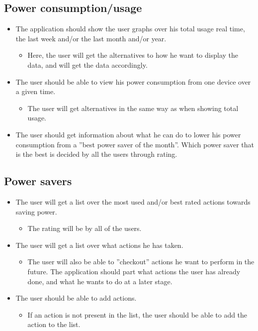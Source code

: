 \subsection{Power consumption/usage}
\begin{itemize}
\item The application should show the user graphs over his total usage real time, the last week and/or the last month and/or year.
\begin{itemize}
\item Here, the user will get the alternatives to how he want to display the data, and will get the data accordingly.
\end{itemize}
\item The user should be able to view his power consumption from one device over a given time.
\begin{itemize}
\item The user will get alternatives in the same way as when showing total usage.
\end{itemize}
\item The user should get information about what he can do to lower his power consumption from a ''best power saver of the month''. Which power saver that is the best is decided by all the users through rating.
\end{itemize}

\subsection{Power savers}

\begin{itemize}
\item The user will get a list over the most used and/or best rated actions towards saving power.
\begin{itemize}
\item The rating will be by all of the users.
\end{itemize}
\item The user will get a list over what actions he has taken.
\begin{itemize}
\item The user will also be able to ''checkout'' actions he want to perform in the future. The application should part what actions the user has already done, and what he wants to do at a later stage.
\end{itemize}
\item The user should be able to add actions.
\begin{itemize}
\item If an action is not present in the list, the user should be able to add the action to the list.
\end{itemize}
\end{itemize}


